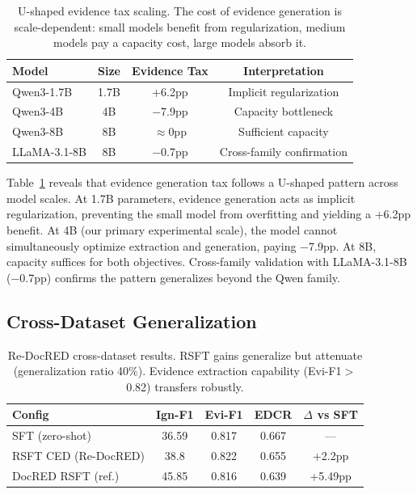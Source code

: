 \documentclass[11pt,a4paper]{article}
\begin{document}
\begin{table}[t]
\centering
\small
\begin{tabular}{lccc}
\toprule
\textbf{Model} & \textbf{Size} & \textbf{Evidence Tax} & \textbf{Interpretation} \\
\midrule
Qwen3-1.7B & 1.7B & +6.2pp & Implicit regularization \\
Qwen3-4B & 4B & $-$7.9pp & Capacity bottleneck \\
Qwen3-8B & 8B & $\approx$0pp & Sufficient capacity \\
LLaMA-3.1-8B & 8B & $-$0.7pp & Cross-family confirmation \\
\bottomrule
\end{tabular}
\caption{U-shaped evidence tax scaling. The cost of evidence generation is scale-dependent: small models benefit from regularization, medium models pay a capacity cost, large models absorb it.}
\label{tab:scaling}
\end{table}

Table~\ref{tab:scaling} reveals that evidence generation tax follows a U-shaped pattern across model scales. At 1.7B parameters, evidence generation acts as implicit regularization, preventing the small model from overfitting and yielding a +6.2pp benefit. At 4B (our primary experimental scale), the model cannot simultaneously optimize extraction and generation, paying $-$7.9pp. At 8B, capacity suffices for both objectives. Cross-family validation with LLaMA-3.1-8B ($-$0.7pp) confirms the pattern generalizes beyond the Qwen family.

\subsection{Cross-Dataset Generalization}

\begin{table}[t]
\centering
\small
\begin{tabular}{lcccc}
\toprule
\textbf{Config} & \textbf{Ign-F1} & \textbf{Evi-F1} & \textbf{EDCR} & \textbf{$\Delta$ vs SFT} \\
\midrule
SFT (zero-shot) & 36.59 & 0.817 & 0.667 & --- \\
RSFT CED (Re-DocRED) & 38.8 & 0.822 & 0.655 & +2.2pp \\
DocRED RSFT (ref.) & 45.85 & 0.816 & 0.639 & +5.49pp \\
\bottomrule
\end{tabular}
\caption{Re-DocRED cross-dataset results. RSFT gains generalize but attenuate (generalization ratio 40\%). Evidence extraction capability (Evi-F1$>$0.82) transfers robustly.}
\label{tab:redocred}
\end{table}
\end{document}
